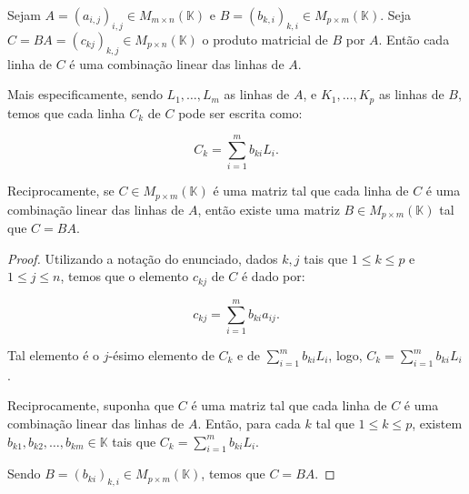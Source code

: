 \begin{proposition}
    Sejam $A=(a_{i, j})_{i, j}\in M_{m \times n}(\mathbb K)$ e $B=(b_{k, i})_{k, i}\in M_{p \times m}(\mathbb K)$.
    Seja $C=BA=(c_{kj})_{k,j}\in M_{p \times n}(\mathbb K)$ o produto matricial de $B$ por $A$.
    Então cada linha de $C$ é uma combinação linear das linhas de $A$.

    Mais especificamente, sendo $L_1, \dots, L_m$ as linhas de $A$, e $K_1, \dots, K_p$ as linhas de $B$, temos que cada linha $C_k$ de $C$ pode ser escrita como:

    \begin{equation*}
        C_k = \sum_{i=1}^m b_{ki} L_i.
    \end{equation*}

    Reciprocamente, se $C \in M_{p \times m}(\mathbb K)$ é uma matriz tal que cada linha de $C$ é uma combinação linear das linhas de $A$, então existe uma matriz $B\in M_{p \times m}(\mathbb K)$ tal que $C=BA$.
\end{proposition}
\begin{proof}
    Utilizando a notação do enunciado, dados $k, j$ tais que $1\leq k \leq p$ e $1\leq j \leq n$, temos que o elemento $c_{kj}$ de $C$ é dado por:

    \begin{equation*}
        c_{kj} = \sum_{i=1}^m b_{ki} a_{ij}.
    \end{equation*}

    Tal elemento é o $j$-ésimo elemento de $C_k$ e de $\sum_{i=1}^m b_{ki} L_i$, logo, $C_k = \sum_{i=1}^m b_{ki} L_i$.

    Reciprocamente, suponha que $C$ é uma matriz tal que cada linha de $C$ é uma combinação linear das linhas de $A$. Então, para cada $k$ tal que $1\leq k \leq p$, existem $b_{k1}, b_{k2}, \ldots, b_{km}\in \mathbb K$ tais que $C_k = \sum_{i=1}^m b_{ki} L_i$.

    Sendo $B=(b_{ki})_{k,i}\in M_{p \times m}(\mathbb K)$, temos que $C=BA$.
\end{proof}

